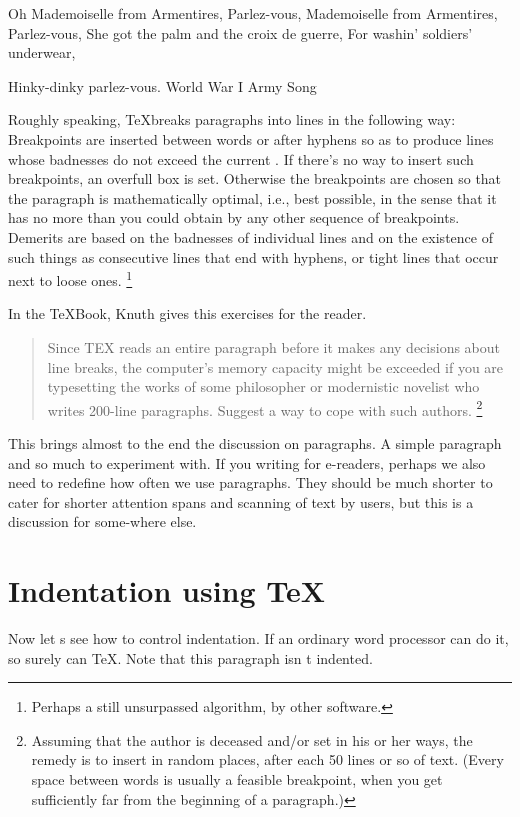 {{Oh Mademoiselle from Armentires, Parlez-vous,
Mademoiselle from Armentires, Parlez-vous,
She got the palm and the croix de guerre,
For washin' soldiers' underwear,

Hinky-dinky parlez-vous.
\hfil World War I Army Song\par}

Roughly speaking, \TeX breaks paragraphs into lines in the following
way: Breakpoints are inserted between words or after hyphens so as to produce
lines whose badnesses do not exceed the current . If there's no way
to insert such breakpoints, an overfull box is set. Otherwise the breakpoints are
chosen so that the paragraph is mathematically optimal, i.e., best possible, in
the sense that it has no more  than you could obtain by any other
sequence of breakpoints. Demerits are based on the badnesses of individual lines
and on the existence of such things as consecutive lines that end with hyphens,
or tight lines that occur next to loose ones.  \footnote{Perhaps a still unsurpassed algorithm, by other software.}

In the TeXBook, Knuth gives this exercises for the reader. 
\begin{quotation}
Since TEX reads an entire paragraph before it makes any decisions about
line breaks, the computer's memory capacity might be exceeded if you are typesetting
the works of some philosopher or modernistic novelist who writes 200-line paragraphs.
Suggest a way to cope with such authors. \footnote{Assuming that the author is deceased and/or set in his or her ways, the remedy
is to insert {   } in random places, after
each 50 lines or so of text. (Every space between words is usually a feasible breakpoint,
when you get sufficiently far from the beginning of a paragraph.)}
\end{quotation}

This brings almost to the end the discussion on paragraphs. A simple paragraph and so much to experiment with. If you writing for e-readers, perhaps we also need to redefine how often we use paragraphs. They should be much shorter to cater for shorter attention spans and scanning of text by users, but this is a discussion for some-where else.

\section{Indentation using TeX}

\noindent Now let s see how to control indentation. If an
ordinary word processor can do it, so surely can \TeX. Note
that this paragraph isn t indented.

}
